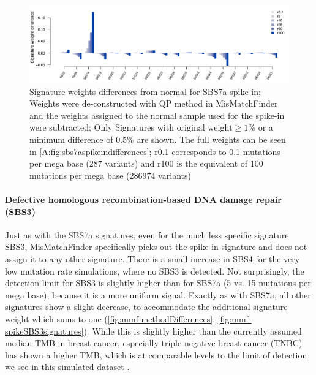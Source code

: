 \begin{figure}[!ht]
\centering
\includegraphics[width=.99\linewidth]{Figures/SBS7SpikeInSignatureDifferencesFocussed.pdf}
\caption[Signature weights differences from normal for SBS7a spike-in]{Signature weights differences from normal for SBS7a spike-in; Weights were de-constructed with QP method in MisMatchFinder and the weights assigned to the normal sample used for the spike-in were subtracted; Only Signatures with $\text{original weight}\geq 1\%$ or a minimum difference of 0.5\% are shown. The full weights can be seen in \protect\autoref{A:fig:sbs7aspikeindifferences}; r0.1 corresponds to 0.1 mutations per mega base (287 variants) and r100 is the equivalent of 100 mutations per mega base (286974 variants)}\label{fig:mmf-spikeSBS7asignatures}
\end{figure}

\paragraph{Defective homologous recombination-based DNA damage repair (SBS3)}
\label{mmf-sec:mbcSim}

Just as with the SBS7a signatures, even for the much less specific signature SBS3, MisMatchFinder specifically picks out the spike-in signature and does not assign it to any other signature. There is a small increase in SBS4 for the very low mutation rate simulations, where no SBS3 is detected. Not surprisingly, the detection limit for SBS3 is slightly higher than for SBS7a (5 vs. 15 mutations per mega base), because it is a more uniform signal. Exactly as with SBS7a, all other signatures show a slight decrease, to accommodate the additional signature weight which sums to one (\autoref{fig:mmf-methodDifferences}, \autoref{fig:mmf-spikeSBS3signatures}). While this is slightly higher than the currently assumed median TMB in breast cancer, especially triple negative breast cancer (TNBC) has shown a higher TMB, which is at comparable levels to the limit of detection we see in this simulated dataset \cite{BarrosoSousa2020}.

